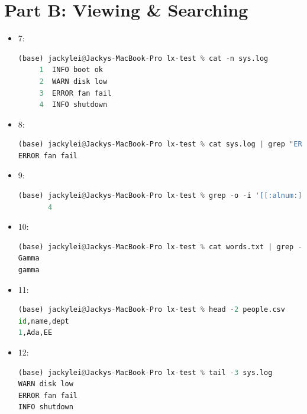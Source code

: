 \section{Part B: Viewing \& Searching}
\begin{itemize}
    \item 7: 
        \begin{lstlisting}[language=Python]
(base) jackylei@Jackys-MacBook-Pro lx-test % cat -n sys.log
     1	INFO boot ok
     2	WARN disk low
     3	ERROR fan fail
     4	INFO shutdown
        \end{lstlisting}
    \item 8:
        \begin{lstlisting}[language=Python]
(base) jackylei@Jackys-MacBook-Pro lx-test % cat sys.log | grep "ERROR"
ERROR fan fail
        \end{lstlisting}
    \item 9:
        \begin{lstlisting}[language=Python]
(base) jackylei@Jackys-MacBook-Pro lx-test % grep -o -i '[[:alnum:]]\+' words.txt | sort -u | wc -l
       4
        \end{lstlisting}
    \item 10:
        \begin{lstlisting}[language=Python]
(base) jackylei@Jackys-MacBook-Pro lx-test % cat words.txt | grep -i "g"
Gamma
gamma
        \end{lstlisting}
    \item 11:
        \begin{lstlisting}[language=Python]
(base) jackylei@Jackys-MacBook-Pro lx-test % head -2 people.csv
id,name,dept
1,Ada,EE
        \end{lstlisting}
    \item 12:
        \begin{lstlisting}[language=Python]
(base) jackylei@Jackys-MacBook-Pro lx-test % tail -3 sys.log
WARN disk low
ERROR fan fail
INFO shutdown
        \end{lstlisting}
\end{itemize}

